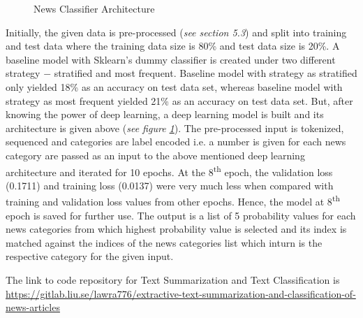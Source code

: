 \documentclass[a4paper,4pt]{article}
\begin{document}
\begin{center}
\begin{figure}[h]
\begin{minipage}{.6\textwidth}
            \caption{News Classifier Architecture}
            \label{fig:deeplearningarchitecture}
        \end{minipage}
    \end{figure} 
\end{center}
Initially, the given data is pre-processed (\textit{see section 5.3}) and split into training and test data where the training data 
size is 80\% and test data size is 20\%. A baseline model with Sklearn's dummy classifier is created under two different strategy 
$-$ stratified and most frequent. Baseline model with strategy as stratified only yielded 18\% as an accuracy on test data set, 
whereas baseline model with strategy as most frequent yielded 21\% as an accuracy on test data set.
But, after knowing the power of deep learning, a deep learning model is built and its architecture is given above (\textit{see figure \ref{fig:deeplearningarchitecture}}).
The pre-processed input is tokenized, sequenced and categories are label encoded i.e. a number is given for each news category are 
passed as an input to the above mentioned deep learning architecture and iterated for 10 epochs. 
At the 8\textsuperscript{th} epoch, the validation loss (0.1711) and training loss (0.0137) were very much less when compared with training and validation loss
values from other epochs. Hence, the model at 8\textsuperscript{th} epoch is saved for further use.
The output is a list of 5 probability values for each news categories from which highest probability value is selected and its 
index is matched against the indices of the news categories list which inturn is the respective category for the given input. \\
\par
The link to code repository for Text Summarization and Text Classification is \href{https://gitlab.liu.se/lawra776/extractive-text-summarization-and-classification-of-news-articles}
{https://gitlab.liu.se/lawra776/extractive-text-summarization-and-classification-of-news-articles}
\end{document}

